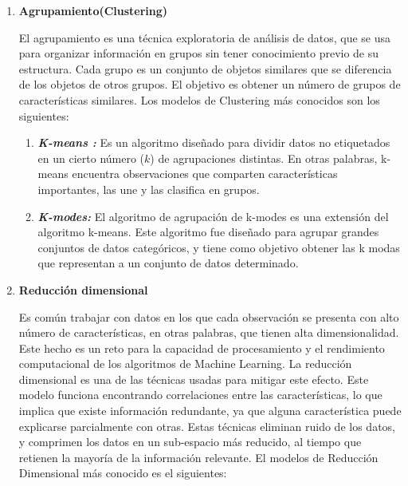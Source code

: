 \begin{enumerate}[label=\textbf{\arabic*})]
	
	\item \textbf{Agrupamiento(Clustering)}
	
	El agrupamiento es una técnica exploratoria de análisis de datos, que se usa para organizar información en grupos sin tener conocimiento previo de su estructura. Cada grupo es un conjunto de objetos similares que se diferencia de los objetos de otros grupos. El objetivo es obtener un número de grupos de características similares\cite{BriegaLopez2015}. Los modelos de Clustering más conocidos son los siguientes:
	
	\begin{enumerate}[label=\textbf{(\alph*)}]
		\item \textit{\textbf{K-means :}}
		Es un algoritmo diseñado para dividir datos no etiquetados en un cierto número ($k$) de agrupaciones distintas. En otras palabras, k-means encuentra observaciones que comparten características importantes, las une y las clasifica en grupos\cite{Jeffares2019}. 
		
		\item \textit{\textbf{K-modes:}}
		El algoritmo de agrupación de k-modes es una extensión del algoritmo k-means. Este algoritmo fue diseñado para agrupar grandes conjuntos de datos categóricos, y tiene como objetivo obtener las k modas que representan a un conjunto de datos determinado\cite{Ramirez2020}.
	\end{enumerate}
	
	\item \textbf{Reducción dimensional}
	
	Es común trabajar con datos en los que cada observación se presenta con alto número de características, en otras palabras, que tienen alta dimensionalidad. Este hecho es un reto para la capacidad de procesamiento y el rendimiento computacional de los algoritmos de Machine Learning. La reducción dimensional es una de las técnicas usadas para mitigar este efecto. Este modelo funciona encontrando correlaciones entre las características, lo que implica que existe información redundante, ya que alguna característica puede explicarse parcialmente con otras. Estas técnicas eliminan ruido de los datos, y comprimen los datos en un sub-espacio más reducido, al tiempo que retienen la mayoría de la información relevante\cite{BriegaLopez2015}. El modelos de Reducción Dimensional más conocido es el siguientes:
	

\end{enumerate}
